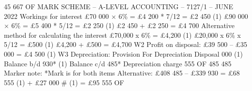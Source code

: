 \documentclass{article}
\begin{document}
45 667 OF \newline
 \newline
 \newline
 \newline
 \newline
MARK SCHEME – A-LEVEL ACCOUNTING – 7127/1 – JUNE 2022  \newline
Workings for interest  \newline
£70 000 × 6\% = £4 200 * 7/12 = £2 450 (1) \newline
£90 000 × 6\% = £5 400 * 5/12 = £2 250 (1) \newline
£2 450 + £2 250 = £4 700 \newline
 \newline
Alternative method for calculating the interest \newline
£70,000 x 6\% = £4,200 (1) \newline
£20,000 x 6\% x 5/12 = £500 (1) \newline
£4,200 + £500 = £4,700 \newline
 \newline
 \newline
  \newline
W2 Profit on disposal: \newline
£39 500 – £35 000 = £4 500 (1) \newline
  \newline
 \newline
W3 Depreciation: \newline
Provision For Depreciation \newline
Disposal  000 (1) Balance b/d  930* (1) \newline
Balance c/d  485* Depreciation charge  555 OF \newline
  485   485 \newline
 \newline
Marker note:  \newline
 \newline
*Mark is for both items  \newline
 \newline
Alternative: \newline
£408 485 – £339 930 = £68 555 (1) + £27 000 \# (1) = £95 555 OF \newline
\end{document}
